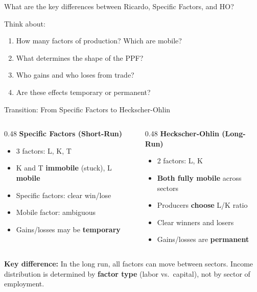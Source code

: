 \documentclass{beamer}
\begin{document}

\begin{frame}{What are the key differences between Ricardo, Specific Factors, and HO?}

\vspace{0.3cm}

Think about:
\begin{enumerate}
    \item How many factors of production? Which are mobile?
    \item What determines the shape of the PPF?
    \item Who gains and who loses from trade?
    \item Are these effects temporary or permanent?
\end{enumerate}

\end{frame}

\begin{frame}{Transition: From Specific Factors to Heckscher-Ohlin}

\begin{columns}[T]
\begin{column}{0.48\textwidth}
\textbf{Specific Factors (Short-Run)}
\begin{itemize}
    \item 3 factors: L, K, T
    \item K and T \textbf{immobile} (stuck), L \textbf{mobile}
    \item Specific factors: clear win/lose
    \item Mobile factor: ambiguous
    \item Gains/losses may be \textbf{temporary}
\end{itemize}
\end{column}

\begin{column}{0.48\textwidth}
\textbf{Heckscher-Ohlin (Long-Run)}
\begin{itemize}
    \item 2 factors: L, K
    \item \textbf{Both fully mobile} across sectors
    \item Producers \textbf{choose} L/K ratio
    \item Clear winners and losers
    \item Gains/losses are \textbf{permanent}
\end{itemize}
\end{column}
\end{columns}

\vspace{0.5cm}

\textbf{Key difference:} In the long run, all factors can move between sectors. Income distribution is determined by \textbf{factor type} (labor vs.\ capital), not by sector of employment.

\end{frame}
\end{document}
